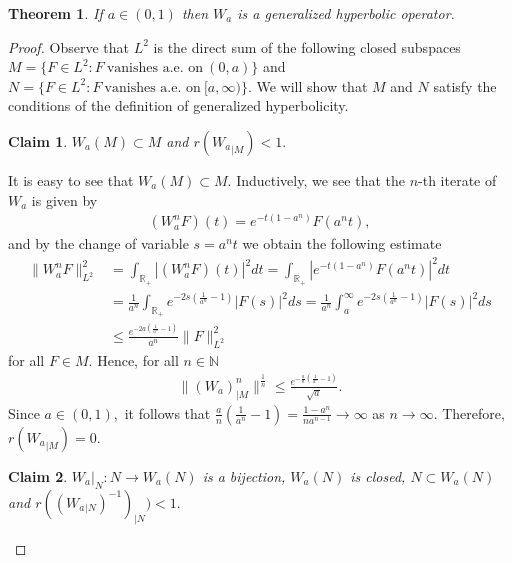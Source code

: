 \documentclass[11pt]{amsart}
\newtheorem{claim}{Claim}
\theoremstyle{plain}
\newtheorem{theorem}[definition]{Theorem}
\theoremstyle{remark}
\theoremstyle{plain}
\begin{document}
\begin{theorem}\label{Teo Difícil} If $a\in (0,1)$ then $W_a$ is a generalized hyperbolic operator.
\end{theorem}

\begin{proof}  Observe that $L^2$ is the direct sum of the following closed subspaces $M=\{F\in L^2:F \ \text{vanishes a.e. on}\ (0,a) \}$ and $N=\{F\in L^2:F\ \text{vanishes a.e. on}\ [a, \infty) \}.$  We will show that $M$ and $N$ satisfy the conditions of the definition of generalized hyperbolicity. 

\begin{claim}
$W_a(M)\subset M$ and $r({W_a}_{|M})<1.$ 
\end{claim}
It is easy to see that $W_a(M)\subset M.$ Inductively, we see that the $n$-th iterate of $W_a$ is given by
\begin{align*}
(W_a^nF)(t)=e^{-t(1-a^n)}F(a^nt),
\end{align*}
and by the change of variable $s=a^nt$ we obtain the following estimate
\begin{align*}
\|W_a^n F\|^2_{L^2} & = \int_{\mathbb{R}_+} |(W_a^nF)(t)|^2 dt =\int_{\mathbb{R}_+} |e^{-t(1 - a^n)} F(a^nt)|^2 dt\\
&=\frac{1}{a^n} \int_{\mathbb{R}_+} e^{-2s( \frac{1}{a^n} - 1)} |F(s)|^2 ds  =  \frac{1}{a^n} \int_{a}^{\infty} e^{-2s( \frac{1}{a^n} - 1)} |F(s)|^2 ds \\
&\leq  \frac{e^{-2a( \frac{1}{a^n} - 1)}}{a^n}  \|F\|_{L^2}^2
\end{align*}
for all $F\in M.$ Hence, for all $n \in \mathbb{N}$
\begin{align*}
\|(W_a)^n_{|M}\|^{\frac{1}{n}} \leq  \frac{e^{-\frac{a}{n}( \frac{1}{a^n} - 1)}}{\sqrt{a}} .
\end{align*}
 Since $a\in(0,1),$ it follows that $\frac{a}{n}( \frac{1}{a^n} - 1) =  \frac{ 1 - a^n}{na^{n - 1}} \to  \infty$ as $n \to \infty.$ Therefore, $r({W_a}_{|M}) = 0$.


\begin{claim} ${W_a}|_{N}: N \to W_a(N)$ is a bijection, $W_a(N)$ is closed,  $N \subset W_a(N)$ and $r((W_a{_{|N}})^{-1})_{|N})< 1.$ 
\end{claim}


\end{proof}
\end{document}
